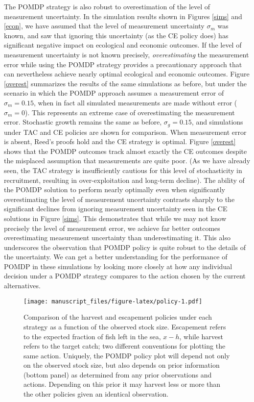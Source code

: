 \documentclass[3p]{elsarticle} %
\makeatletter
\def\maxwidth{\ifdim\Gin@nat@width>\linewidth\linewidth
\else\Gin@nat@width\fi}
\let\Oldincludegraphics\includegraphics
\renewcommand{\includegraphics}[1]{\Oldincludegraphics[width=\maxwidth]{#1}}
\makeatother
\begin{document}
The POMDP strategy is also robust to overestimation of the level of
measurement uncertainty. In the simulation results shown in Figures
\ref{sims} and \ref{econ}, we have assumed that the level of measurement
uncertainty \(\sigma_m\) was known, and saw that ignoring this
uncertainty (as the CE policy does) has significant negative impact on
ecological and economic outcomes. If the level of measurement
uncertainty is not known precisely, \emph{overestimating} the
measurement error while using the POMDP strategy provides a
precautionary approach that can nevertheless achieve nearly optimal
ecological and economic outcomes. Figure \ref{overest} summarizes the
results of the same simulations as before, but under the scenario in
which the POMDP approach assumes a measurement error of
\(\sigma_m = 0.15\), when in fact all simulated measurements are made
without error (\(\sigma_m = 0\)). This represents an extreme case of
overestimating the measurement error. Stochastic growth remains the same
as before, \(\sigma_g = 0.15\), and simulations under TAC and CE
policies are shown for comparison. When measurement error is absent,
Reed's proofs hold and the CE strategy is optimal. Figure \ref{overest}
shows that the POMDP outcomes track almost exactly the CE outcomes
despite the misplaced assumption that measurements are quite poor. (As
we have already seen, the TAC strategy is insufficiently cautious for
this level of stochasticity in recruitment, resulting in
over-exploitation and long-term decline). The ability of the POMDP
solution to perform nearly optimally even when significantly
overestimating the level of measurement uncertainty contrasts sharply to
the significant declines from ignoring measurement uncertainty seen in
the CE solutions in Figure \ref{sims}. This demonstrates that while we
may not know precisely the level of measurement error, we achieve far
better outcomes overestimating measurement uncertainty than
underestimating it. This also underscores the observation that POMDP
policy is quite robust to the details of the uncertainty. We can get a
better understanding for the performance of POMDP in these simulations
by looking more closely at how any individual decision under a POMDP
strategy compares to the action chosen by the current alternatives.

\begin{figure}
\centering
\texttt{[image: manuscript\_files/figure-latex/policy-1.pdf]}
\caption{Comparison of the harvest and escapement policies under each
strategy as a function of the observed stock size. Escapement refers to
the expected fraction of fish left in the sea, \(x-h\), while harvest
refers to the target catch; two different conventions for plotting the
same action. Uniquely, the POMDP policy plot will depend not only on the
observed stock size, but also depends on prior information (bottom
panel) as determined from any prior observations and actions. Depending
on this prior it may harvest less or more than the other policies given
an identical observation.\label{policy}}
\end{figure}
\end{document}
